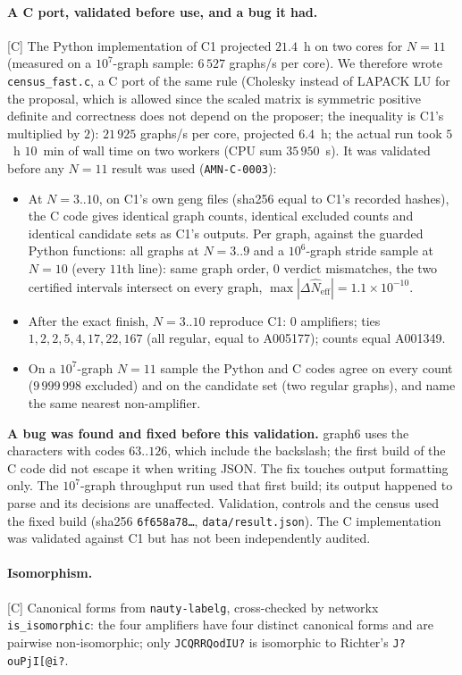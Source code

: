\documentclass[10pt]{article}
\newcommand{\tier}[1]{\textsf{[#1]}}
\newcommand{\tC}{\tier{C}}
\begin{document}
\paragraph{A C port, validated before use, and a bug it had.}\tC{} The Python implementation of C1 projected $21.4$~h on two cores for $N=11$ (measured on a $10^7$-graph sample: $6\,527$ graphs/s per core). We therefore wrote \texttt{census\_fast.c}, a C port of the same rule (Cholesky instead of LAPACK LU for the proposal, which is allowed since the scaled matrix is symmetric positive definite and correctness does not depend on the proposer; the inequality is C1's multiplied by $2$): $21\,925$ graphs/s per core, projected $6.4$~h; the actual run took $5$~h $10$~min of wall time on two workers (CPU sum $35\,950$~s). It was validated before any $N=11$ result was used (\texttt{AMN-C-0003}):
\begin{itemize}\itemsep=0pt
\item At $N=3..10$, on C1's own geng files (sha256 equal to C1's recorded hashes), the C code gives identical graph counts, identical excluded counts and identical candidate sets as C1's outputs. Per graph, against the guarded Python functions: all graphs at $N=3..9$ and a $10^6$-graph stride sample at $N=10$ (every $11$th line): same graph order, $0$ verdict mismatches, the two certified intervals intersect on every graph, $\max|\Delta\hat N_{\mathrm{eff}}|=1.1\times10^{-10}$.
\item After the exact finish, $N=3..10$ reproduce C1: $0$ amplifiers; ties $1,2,2,5,4,17,22,167$ (all regular, equal to A005177); counts equal A001349.
\item On a $10^7$-graph $N=11$ sample the Python and C codes agree on every count ($9\,999\,998$ excluded) and on the candidate set (two regular graphs), and name the same nearest non-amplifier.
\end{itemize}
\textbf{A bug was found and fixed before this validation.} graph6 uses the characters with codes $63..126$, which include the backslash; the first build of the C code did not escape it when writing JSON. The fix touches output formatting only. The $10^7$-graph throughput run used that first build; its output happened to parse and its decisions are unaffected. Validation, controls and the census used the fixed build (sha256 \texttt{6f658a78\dots}, \texttt{data/result.json}). The C implementation was validated against C1 but has not been independently audited.

\paragraph{Isomorphism.}\tC{} Canonical forms from \texttt{nauty-labelg}, cross-checked by networkx \texttt{is\_isomorphic}: the four amplifiers have four distinct canonical forms and are pairwise non-isomorphic; only \texttt{JCQRRQodIU?} is isomorphic to Richter's \texttt{J?ouPjI[@i?}.
\end{document}
